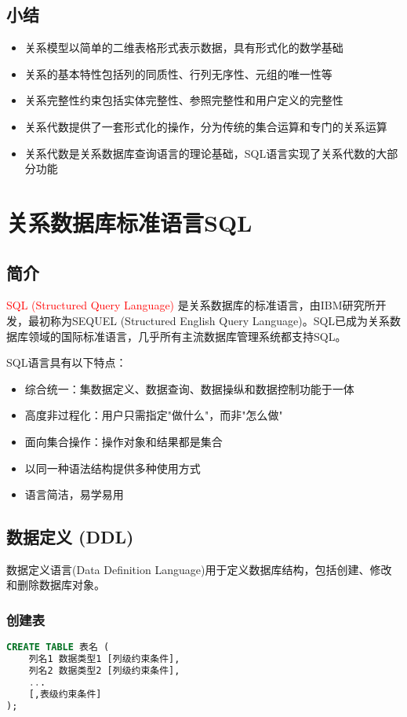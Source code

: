 \documentclass{../../note}
\begin{document}
\subsection{小结}

\begin{itemize}
  \item 关系模型以简单的二维表格形式表示数据，具有形式化的数学基础
  \item 关系的基本特性包括列的同质性、行列无序性、元组的唯一性等
  \item 关系完整性约束包括实体完整性、参照完整性和用户定义的完整性
  \item 关系代数提供了一套形式化的操作，分为传统的集合运算和专门的关系运算
  \item 关系代数是关系数据库查询语言的理论基础，SQL语言实现了关系代数的大部分功能
\end{itemize}

\section{关系数据库标准语言SQL}

\subsection{简介}
\textcolor{red}{SQL (Structured Query Language)} 是关系数据库的标准语言，由IBM研究所开发，最初称为SEQUEL (Structured English Query Language)。SQL已成为关系数据库领域的国际标准语言，几乎所有主流数据库管理系统都支持SQL。

SQL语言具有以下特点：
\begin{itemize}
    \item 综合统一：集数据定义、数据查询、数据操纵和数据控制功能于一体
    \item 高度非过程化：用户只需指定"做什么"，而非"怎么做"
    \item 面向集合操作：操作对象和结果都是集合
    \item 以同一种语法结构提供多种使用方式
    \item 语言简洁，易学易用
\end{itemize}

\subsection{数据定义 (DDL)}
数据定义语言(Data Definition Language)用于定义数据库结构，包括创建、修改和删除数据库对象。

\subsubsection{创建表}
\begin{lstlisting}[language=SQL, caption=创建表的基本语法, label=sql:create-table]
CREATE TABLE 表名 (
    列名1 数据类型1 [列级约束条件],
    列名2 数据类型2 [列级约束条件],
    ...
    [,表级约束条件]
);
\end{lstlisting}
\end{document}
